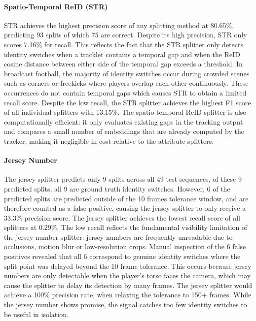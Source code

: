 \paragraph{Spatio-Temporal ReID (STR)}
STR achieves the highest precision score of any splitting method at 80.65\%, predicting 93 splits of which 75 are correct. Despite its high precision, STR only scores 7.16\% for recall. This reflects the fact that the STR splitter only detects identity switches when a tracklet contains a temporal gap and when the ReID cosine distance between either side of the temporal gap exceeds a threshold. In broadcast football, the majority  of identity switches occur during crowded scenes such as corners or freekicks where players overlap each other continuously. These occurrences do not contain temporal gaps which causes STR to obtain a limited recall score. Despite the low recall, the STR splitter achieves the highest F1 score of all individual splitters with 13.15\%. The spatio-temporal ReID splitter is also computationally efficient: it only evaluates existing gaps in the tracking output and compares a small number of embeddings that are already computed by the tracker, making it negligible in cost relative to the attribute splitters.  

\paragraph{Jersey Number}
The jersey splitter predicts only 9 splits across all 49 test sequences, of these 9 predicted splits, all 9 are ground truth identity switches. However, 6 of the predicted splits are predicted outside of the 10 frames tolerance window, and are therefore counted as a false positive, causing the jersey splitter to only receive a 33.3\% precision score. The jersey splitter achieves the lowest recall score of all splitters at 0.29\%. The low recall reflects the fundamental visibility limitation of the jersey number splitter: jersey numbers are frequently unreadable due to occlusions, motion blur or low-resolution crops. Manual inspection of the 6 false positives revealed that all 6 correspond to genuine identity switches where the split point was delayed beyond the 10 frame tolerance. This occurs because jersey numbers are only detectable when the player's torso faces the camera, which may cause the splitter to delay its detection by many frames. The jersey splitter would achieve a 100\% precision rate, when relaxing the tolerance to 150+ frames. While the jersey number shows promise, the signal catches too few identity switches to be useful in isolation. 

